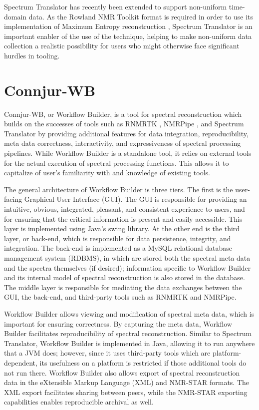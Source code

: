 Spectrum Translator has recently been extended to support non-uniform time-domain
data.  As the Rowland NMR Toolkit format is required in order to use its 
implementation of Maximum Entropy reconstruction \cite{rnmrtk}, Spectrum
Translator is an important enabler of the use of the technique, helping to 
make non-uniform data collection a realistic possibility for users who might
otherwise face significant hurdles in tooling.


\section{Connjur-WB}
Connjur-WB, or Workflow Builder, is a tool for spectral reconstruction which
builds on the successes of tools such as RNMRTK \cite{rnmrtk}, NMRPipe \cite{nmrpipe},
and Spectrum Translator \cite{connjur-st} by providing additional features
for data integration, reproducibility, meta data correctness, interactivity,
and expressiveness of spectral processing pipelines.  While Workflow Builder
is a standalone tool, it relies on external tools for the actual execution of
spectral processing functions.  This allows it to capitalize of user's 
familiarity with and knowledge of existing tools.

The general architecture of Workflow Builder is three tiers.  The first is 
the user-facing Graphical User Interface (GUI).  The GUI is responsible for
providing an intuitive, obvious, integrated, pleasant, and consistent experience
to users, and for ensuring that the critical information is present and easily
accessible.  This layer is implemented using Java's swing library.
At the other end is the third layer, or back-end, which is
responsible for data persistence, integrity, and integration.  The back-end
is implemented as a MySQL relational database management system (RDBMS), in
which are stored both the spectral meta data and the spectra themselves (if
desired); information specific to Workflow Builder and its internal model
of spectral reconstruction is also stored in the database.  The middle layer
is responsible for mediating the data exchanges between the GUI, the back-end,
and third-party tools such as RNMRTK and NMRPipe.

Workflow Builder allows viewing and modification of spectral meta data, which 
is important for ensuring correctness.  By capturing the meta data, Workflow
Builder facilitates reproducibility of spectral reconstruction.  Similar to
Spectrum Translator, Workflow Builder is implemented in Java, allowing it to
run anywhere that a JVM does; however, since it uses third-party tools which 
are platform-dependent, its usefulness on a platform is restricted if those
additional tools do not run there.  Workflow Builder also allows export of
spectral reconstruction data in the eXtensible Markup Language (XML) 
and NMR-STAR formats.  The XML export
facilitates sharing between peers, while the NMR-STAR exporting capabilities
enables reproducible archival as well.

